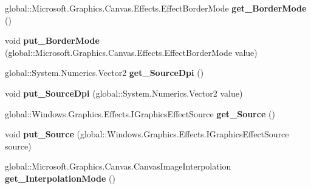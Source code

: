 \begin{DoxyCompactItemize}
global\+::\+Microsoft.\+Graphics.\+Canvas.\+Effects.\+Effect\+Border\+Mode {\bfseries get\+\_\+\+Border\+Mode} ()
\item 
\mbox{\label{interface_microsoft_1_1_graphics_1_1_canvas_1_1_effects_1_1_i_dpi_compensation_effect_ade5071aec175affb5d564c3ff21ab872}} 
void {\bfseries put\+\_\+\+Border\+Mode} (global\+::\+Microsoft.\+Graphics.\+Canvas.\+Effects.\+Effect\+Border\+Mode value)
\item 
\mbox{\label{interface_microsoft_1_1_graphics_1_1_canvas_1_1_effects_1_1_i_dpi_compensation_effect_a52343f4e5f636dfc6a505f71e277c49f}} 
global\+::\+System.\+Numerics.\+Vector2 {\bfseries get\+\_\+\+Source\+Dpi} ()
\item 
\mbox{\label{interface_microsoft_1_1_graphics_1_1_canvas_1_1_effects_1_1_i_dpi_compensation_effect_ae37090d897dfa337b42f53e5dc0b69bd}} 
void {\bfseries put\+\_\+\+Source\+Dpi} (global\+::\+System.\+Numerics.\+Vector2 value)
\item 
\mbox{\label{interface_microsoft_1_1_graphics_1_1_canvas_1_1_effects_1_1_i_dpi_compensation_effect_a9ae226af5c8b8a43bd821a1f03fe01e8}} 
global\+::\+Windows.\+Graphics.\+Effects.\+I\+Graphics\+Effect\+Source {\bfseries get\+\_\+\+Source} ()
\item 
\mbox{\label{interface_microsoft_1_1_graphics_1_1_canvas_1_1_effects_1_1_i_dpi_compensation_effect_a4a6c12a0c99192ed2bbc9a1efcbe0849}} 
void {\bfseries put\+\_\+\+Source} (global\+::\+Windows.\+Graphics.\+Effects.\+I\+Graphics\+Effect\+Source source)
\item 
\mbox{\label{interface_microsoft_1_1_graphics_1_1_canvas_1_1_effects_1_1_i_dpi_compensation_effect_ac5e4888783e519ac1ef3cca2949f28c8}} 
global\+::\+Microsoft.\+Graphics.\+Canvas.\+Canvas\+Image\+Interpolation {\bfseries get\+\_\+\+Interpolation\+Mode} ()

\end{DoxyCompactItemize}
